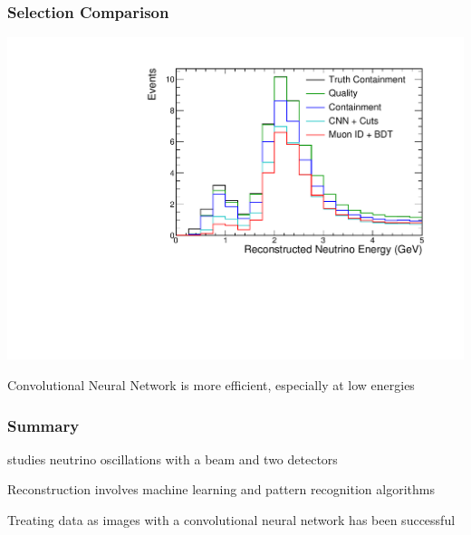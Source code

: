 \documentclass[10pt,professionalfonts,xcolor=table]{beamer}
\begin{document}
\begin{frame}

\frametitle{Selection Comparison}
  \begin{center}
   \includegraphics[height=0.7\textwidth, angle=-90]{figures/selection/cosmic_sig_osc.pdf}
  \end{center}
  \gap
  \bangon
  \item Convolutional Neural Network is more efficient, especially at low energies
  \bangoff
\end{frame}


\begin{frame}
\frametitle{Summary}
\bangon
\item \nova studies neutrino oscillations with a beam and two detectors
\gap
\item Reconstruction involves machine learning and pattern recognition algorithms
\gap
\item Treating data as images with a convolutional neural network has been successful
\bangoff
\end{frame}
\end{document}
